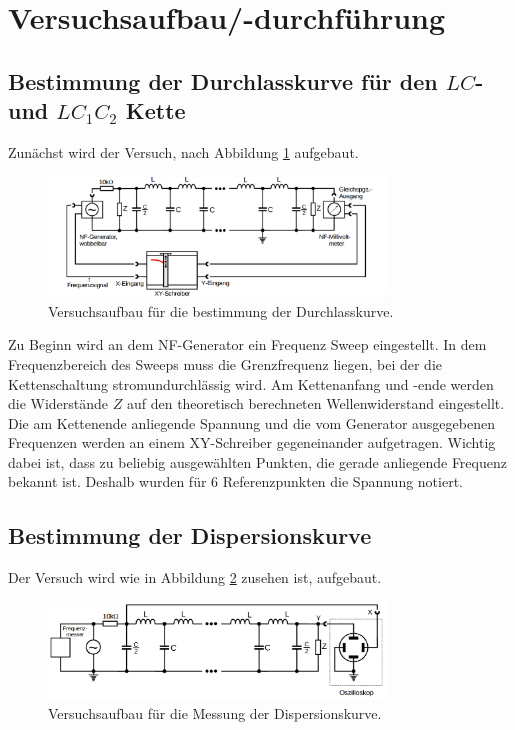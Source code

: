 \section{Versuchsaufbau/-durchführung}

\subsection{Bestimmung der Durchlasskurve für den $LC$- und $LC_1 C_2$ Kette}
Zunächst wird der Versuch, nach Abbildung \ref{fig:aufbau_durchlass} aufgebaut. %
\begin{figure}
  \centering
  \includegraphics[width=0.8\textwidth]{bilder/versuchsaufbau_1.png}
  \caption{Versuchsaufbau für die bestimmung der Durchlasskurve.\cite{}}
  \label{fig:aufbau_durchlass}
\end{figure}

Zu Beginn wird an dem NF-Generator ein Frequenz Sweep eingestellt.
In dem Frequenzbereich des Sweeps muss die Grenzfrequenz liegen, bei der die
Kettenschaltung stromundurchlässig wird. %
Am Kettenanfang und -ende werden die Widerstände $Z$ auf den theoretisch
berechneten Wellenwiderstand eingestellt.
Die am Kettenende anliegende Spannung und die vom Generator ausgegebenen Frequenzen
werden an einem XY-Schreiber gegeneinander aufgetragen.
Wichtig dabei ist, dass zu beliebig ausgewählten Punkten, die gerade anliegende Frequenz bekannt ist.
Deshalb wurden für 6 Referenzpunkten die Spannung notiert.  %


\subsection{Bestimmung der Dispersionskurve}
Der Versuch wird wie in Abbildung \ref{fig:aufbau_dispersion} zusehen ist, aufgebaut.%
\begin{figure}
  \centering
  \includegraphics[width=0.8\textwidth]{bilder/versuchsaufbau_dispersion.png}
  \caption{Versuchsaufbau für die Messung der Dispersionskurve.\cite{manual}}
  \label{fig:aufbau_dispersion}
\end{figure}

